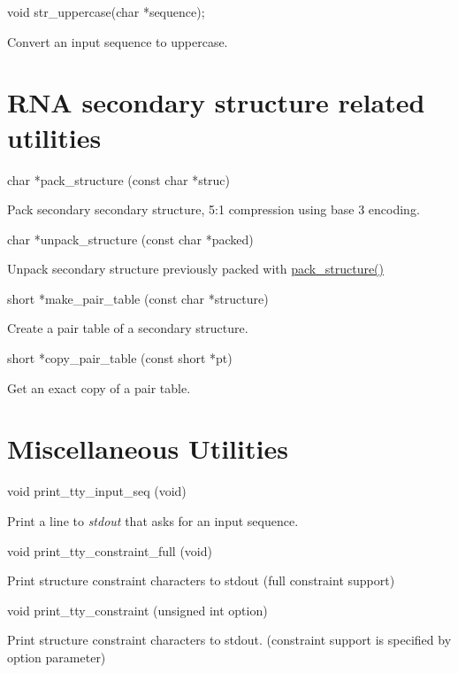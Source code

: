 \begin{DoxyVerb}void str_uppercase(char *sequence);
\end{DoxyVerb}
 Convert an input sequence to uppercase.

\hypertarget{mp_utils_utils_struc}{}\section{R\-N\-A secondary structure related utilities}\label{mp_utils_utils_struc}
\begin{DoxyVerb}char *pack_structure (const char *struc)
\end{DoxyVerb}
 Pack secondary secondary structure, 5\-:1 compression using base 3 encoding.

\begin{DoxyVerb}char *unpack_structure (const char *packed)
\end{DoxyVerb}
 Unpack secondary structure previously packed with \hyperlink{group__struct__utils_gac6dfa5e22928c087c6e09ff0054a7ced}{pack\-\_\-structure()}

\begin{DoxyVerb}short *make_pair_table (const char *structure)
\end{DoxyVerb}
 Create a pair table of a secondary structure.

\begin{DoxyVerb}short *copy_pair_table (const short *pt)
\end{DoxyVerb}
 Get an exact copy of a pair table.

\hypertarget{mp_utils_utils_misc}{}\section{Miscellaneous Utilities}\label{mp_utils_utils_misc}
\begin{DoxyVerb}void print_tty_input_seq (void)
\end{DoxyVerb}
 Print a line to {\itshape stdout} that asks for an input sequence.

\begin{DoxyVerb}void print_tty_constraint_full (void)
\end{DoxyVerb}
 Print structure constraint characters to stdout (full constraint support)

\begin{DoxyVerb}void print_tty_constraint (unsigned int option)
\end{DoxyVerb}
 Print structure constraint characters to stdout. (constraint support is specified by option parameter)

